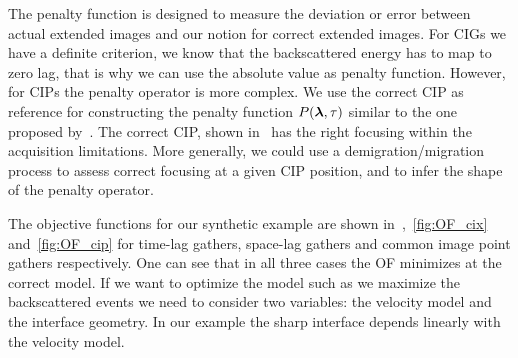 The penalty function is designed to measure the deviation or error between actual extended images and our notion for correct 
extended images. For CIGs we have a definite criterion, we know that the backscattered energy has to map
to zero lag, that is why we can use the absolute value as penalty function. However, for CIPs the 
penalty operator is more complex. We use the correct CIP as reference for constructing the penalty function $P({\boldsymbol{\lambda}},\tau)$ similar
to the one proposed by~\citep{tony:cwp12}. The correct CIP, shown in~ has the right focusing within the acquisition limitations.
More generally, we could use a demigration/migration process to assess correct focusing at a given CIP position, and to infer the shape of 
the penalty operator.

The objective functions for our synthetic example are shown in~,~\ref{fig:OF_cix} and~\ref{fig:OF_cip} for time-lag gathers, space-lag gathers and
common image point gathers respectively. One can see that in all three cases the OF minimizes at the correct model. If we want to optimize the model such as 
we maximize the backscattered events we need to consider two variables: the velocity model and the interface geometry. 
 In our example the sharp interface depends linearly with the velocity model.



